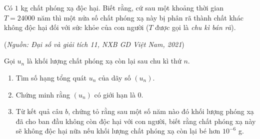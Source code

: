 \begin{bt}%
	Có $1$ kg chất phóng xạ độc hại. Biết rằng, cứ sau một khoảng thời gian $T=24000$ năm thì một nửa số chất phóng xạ này bị phân rã thành chất khác không độc hại đối với sức khỏe của con người ($T$ được gọi là \textit{chu kì bán rã}).
	\begin{flushright}
		(\textit{Nguồn: Đại số và giải tích 11, NXB GD Việt Nam, 2021})
	\end{flushright}
	Gọi $u_n$ là khối lượng chất phóng xạ còn lại sau chu kì thứ $n$.
	\begin{enumerate}
		\item  Tìm số hạng tổng quát $u_n$ của dãy số $(u_n)$.
		\item  Chứng minh rằng $(u_n)$ có giới hạn là $0$.
		\item  Từ kết quả câu $b$, chứng tỏ rằng sau một số năm nào đó khối lượng phóng xạ đã cho ban đầu không còn độc hại với con người, biết rằng chất phóng xạ này sẽ không độc hại nữa nếu khối lượng chất phóng xạ còn lại bé hơn $10^{-6}$ g.
	\end{enumerate}
\end{bt}

